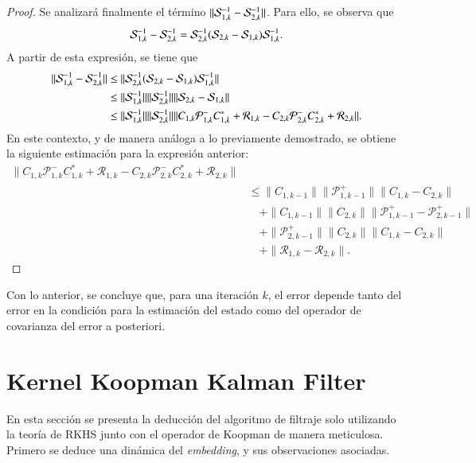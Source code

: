 \begin{proof}
Se analizará finalmente el término $\| \S_{1,k}^{-1} -  \S_{2,k}^{-1}\|$. Para ello, se observa que
\begin{equation*}
	\S_{1,k}^{-1} -  \S_{2,k}^{-1} = \S_{2,k}^{-1} (\S_{2,k} - \S_{1,k}) \S_{1,k}^{-1}.
\end{equation*}
A partir de esta expresión, se tiene que
\begin{equation*}
	\begin{aligned}
		\| \S_{1,k}^{-1} -  \S_{2,k}^{-1} \| & \leq  \| \S_{2,k}^{-1} (\S_{2,k} - \S_{1,k}) \S_{1,k}^{-1} \| \\
		& \leq \| \S_{1,k}^{-1} \| \|  \S_{2,k}^{-1} \| \| \S_{2,k} - \S_{1,k}\| \\
		& \leq  \| \S_{1,k}^{-1} \| \|  \S_{2,k}^{-1} \|  \| C_{1,k} \mathcal{P}_{1,k}^- C_{1,k}^* + \mathcal{R}_{1,k} - C_{2,k} \mathcal{P}_{2,k}^- C_{2,k}^* + \mathcal{R}_{2,k} \|.
	\end{aligned}
\end{equation*}
En este contexto, y de manera análoga a lo previamente demostrado, se obtiene la siguiente estimación para la expresión anterior:
\begin{equation*}
	\begin{aligned}
		\| C_{1,k} \mathcal{P}_{1,k}^- C_{1,k}^* + \mathcal{R}_{1,k} - C_{2,k} \mathcal{P}_{2,k}^- C_{2,k}^* + \mathcal{R}_{2,k} \| \\
		& \leq \|C_{1,k-1} \|  \| \mathcal{P}_{1,k-1}^+ \| \|  C_{1,k} - C_{2,k} \|  \\
            & \quad + \|C_{1,k-1} \|  \| C_{2,k} \| \| \mathcal{P}_{1,k-1}^+  - \mathcal{P}_{2,k-1}^+  \| \\
		& \quad + \| \mathcal{P}_{2,k-1}^+ \| \| C_{2,k}  \| \|C_{1,k} - C_{2,k} \| \\
		& \quad+ \| \mathcal{R}_{1,k} - \mathcal{R}_{2,k}  \|.
	\end{aligned}
\end{equation*}

\end{proof}

Con lo anterior, se concluye que, para una iteración $k$, el error depende tanto del error en la condición para la estimación del estado como del operador de covarianza del error a posteriori.

\section{Kernel Koopman Kalman Filter}

En esta sección se presenta la deducción del algoritmo de filtraje solo utilizando la teoría de RKHS junto con el operador de Koopman de manera meticulosa. Primero se deduce una dinámica del \textit{embedding}, y sus observaciones asociadas.

